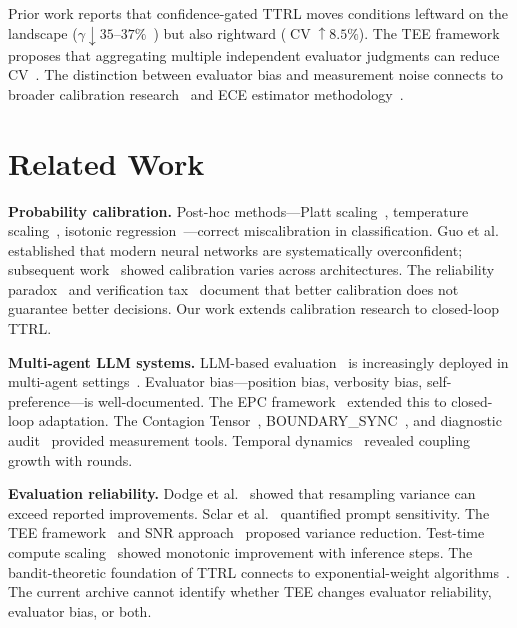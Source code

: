 \documentclass[11pt]{article}
\DeclareMathOperator{\CV}{CV}
\begin{document}
Prior work reports that confidence-gated TTRL moves conditions leftward on the landscape ($\gamma \downarrow 35$--$37\%$~\cite{liu2026caleffects}) but also rightward ($\CV \uparrow 8.5\%$). The TEE framework proposes that aggregating multiple independent evaluator judgments can reduce CV~\cite{messing2026tee}. The distinction between evaluator bias and measurement noise connects to broader calibration research~\cite{guo2017calibration,niculescu2005predicting,kull2017temperature} and ECE estimator methodology~\cite{kumar2019verified,nixon2019measuring,roelofs2022mitigating}.

\section{Related Work}

\textbf{Probability calibration.} Post-hoc methods---Platt scaling~\cite{platt1999probabilistic}, temperature scaling~\cite{kull2017temperature}, isotonic regression~\cite{niculescu2005predicting}---correct miscalibration in classification. Guo et al.~\cite{guo2017calibration} established that modern neural networks are systematically overconfident; subsequent work~\cite{minderer2021revisiting} showed calibration varies across architectures. The reliability paradox~\cite{he2026paradox} and verification tax~\cite{mills2026verification} document that better calibration does not guarantee better decisions. Our work extends calibration research to closed-loop TTRL.

\textbf{Multi-agent LLM systems.} LLM-based evaluation~\cite{zheng2023judging,chiang2024chatbot} is increasingly deployed in multi-agent settings~\cite{li2023camel,wu2024autogen}. Evaluator bias---position bias, verbosity bias, self-preference---is well-documented. The EPC framework~\cite{liu2026epc} extended this to closed-loop adaptation. The Contagion Tensor~\cite{liu2026tensor}, BOUNDARY\_SYNC~\cite{liu2026boundarysync}, and diagnostic audit~\cite{liu2026audit} provided measurement tools. Temporal dynamics~\cite{liu2026temporal} revealed coupling growth with rounds.

\textbf{Evaluation reliability.} Dodge et al.~\cite{dodge2019reproducibility} showed that resampling variance can exceed reported improvements. Sclar et al.~\cite{sclar2024quantifying} quantified prompt sensitivity. The TEE framework~\cite{messing2026tee} and SNR approach~\cite{heineman2025snr} proposed variance reduction. Test-time compute scaling~\cite{snell2024scaling} showed monotonic improvement with inference steps. The bandit-theoretic foundation of TTRL connects to exponential-weight algorithms~\cite{bubeck2012regret}. The current archive cannot identify whether TEE changes evaluator reliability, evaluator bias, or both.
\end{document}
